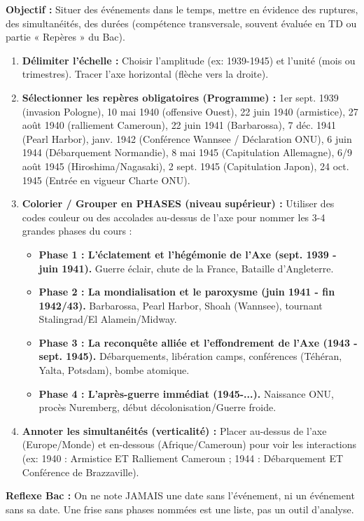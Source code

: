 \documentclass[11pt]{article}
\newcommand{\cle}[1]{{\popxbold\color{popdark}#1}}
\begin{document}
\begin{methode}
\textbf{Objectif :} Situer des événements dans le temps, mettre en évidence des ruptures, des simultanéités, des durées (compétence transversale, souvent évaluée en TD ou partie « Repères » du Bac).
\begin{enumerate}
    \item \textbf{Délimiter l'échelle :} Choisir l'amplitude (ex: 1939-1945) et l'unité (mois ou trimestres). Tracer l'axe horizontal (flèche vers la droite).
    \item \textbf{Sélectionner les repères obligatoires (Programme) :} \cle{1er sept. 1939} (invasion Pologne), \cle{10 mai 1940} (offensive Ouest), \cle{22 juin 1940} (armistice), \cle{27 août 1940} (ralliement Cameroun), \cle{22 juin 1941} (Barbarossa), \cle{7 déc. 1941} (Pearl Harbor), \cle{janv. 1942} (Conférence Wannsee / Déclaration ONU), \cle{6 juin 1944} (Débarquement Normandie), \cle{8 mai 1945} (Capitulation Allemagne), \cle{6/9 août 1945} (Hiroshima/Nagasaki), \cle{2 sept. 1945} (Capitulation Japon), \cle{24 oct. 1945} (Entrée en vigueur Charte ONU).
    \item \textbf{Colorier / Grouper en PHASES (niveau supérieur) :} Utiliser des codes couleur ou des accolades au-dessus de l'axe pour nommer les 3-4 grandes phases du cours :
    \begin{itemize}
        \item \textbf{Phase 1 : L'éclatement et l'hégémonie de l'Axe (sept. 1939 - juin 1941).} Guerre éclair, chute de la France, Bataille d'Angleterre.
        \item \textbf{Phase 2 : La mondialisation et le paroxysme (juin 1941 - fin 1942/43).} Barbarossa, Pearl Harbor, Shoah (Wannsee), tournant Stalingrad/El Alamein/Midway.
        \item \textbf{Phase 3 : La reconquête alliée et l'effondrement de l'Axe (1943 - sept. 1945).} Débarquements, libération camps, conférences (Téhéran, Yalta, Potsdam), bombe atomique.
        \item \textbf{Phase 4 : L'après-guerre immédiat (1945-...).} Naissance ONU, procès Nuremberg, début décolonisation/Guerre froide.
    \end{itemize}
    \item \textbf{Annoter les simultanéités (verticalité) :} Placer au-dessus de l'axe (Europe/Monde) et en-dessous (Afrique/Cameroun) pour voir les interactions (ex: 1940 : Armistice ET Ralliement Cameroun ; 1944 : Débarquement ET Conférence de Brazzaville).
\end{enumerate}
\textbf{Reflexe Bac :} On ne note JAMAIS une date sans l'événement, ni un événement sans sa date. Une frise sans phases nommées est une liste, pas un outil d'analyse.
\end{methode}
\end{document}
